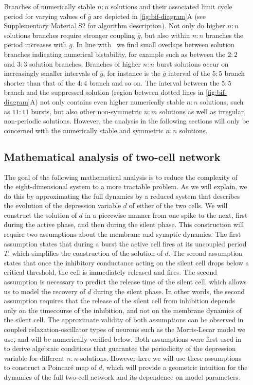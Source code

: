 Branches of numerically stable $n:n$ solutions and their associated limit cycle period for varying values of $\bar g$ are depicted in \cref{fig:bif-diagram}A (see Supplementary Material S2 for algorithm description).
Not only do higher $n:n$ solutions branches require stronger coupling $\bar g$, but also within $n:n$ branches the period increases with $\bar g$.
In line with~\citet{bose2011} we find small overlaps between solution branches indicating numerical bistability, for example such as between the $2:2$ and $3:3$ solution branches.
Branches of higher $n:n$ burst solutions occur on increasingly smaller intervals of $\bar g$, for instance is the $\bar g$ interval of the $5:5$ branch shorter than that of the $4:4$ branch and so on.
The interval between the $5:5$ branch and the suppressed solution (region between dotted lines in \cref{fig:bif-diagram}A) not only contains even higher numerically stable $n:n$ solutions, such as $11:11$ bursts, but also other non-symmetric $n:m$ solutions as well as irregular, non-periodic solutions.
However, the analysis in the following sections will only be concerned with the numerically stable and symmetric $n:n$ solutions.

\subsection{Mathematical analysis of two-cell network}
\label{sec:assumptions}
The goal of the following mathematical analysis is to reduce the complexity of the
eight-dimensional system to a more tractable problem.
As we will explain, we do this by approximating the full dynamics by a reduced system that describes the evolution of the depression variable $d$ of either of the two cells.
We will construct the solution of $d$ in a piecewise manner from one spike to the next, first during the active phase, and then during the silent phase.
This construction will require two assumptions about the membrane and synaptic dynamics.
The first assumption states that during a burst the active cell fires at its uncoupled period $T$, which simplifies the construction of the solution of $d$.
The second assumption states that once the inhibitory conductance acting on the silent cell drops below a critical threshold, the cell is immediately released and fires.
The second assumption is necessary to predict the release time of the silent cell, which allows us to model the recovery of $d$ during the silent phase.
In other words, the second assumption requires that the release of the silent cell from inhibition depends only on the timecourse of the inhibition, and not on the membrane dynamics of the silent cell.
The approximate validity of both assumptions can be observed in coupled relaxation-oscillator types of neurons such as the Morris-Lecar model we use, and will be numerically verified below.
Both assumptions were first used in~\cite{bose2011} to derive algebraic conditions that guarantee the periodicity of the depression variable for different $n:n$ solutions.
However here we will use these assumptions to construct a Poincaré map of $d$, which will provide a geometric intuition for the dynamics of the full two-cell network and its dependence on model parameters.

